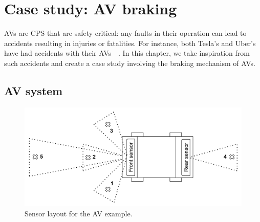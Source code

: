 \section{Case study: \acf{AV} braking}
\label{sec:case}

\acfp{AV} are \acf{CPS} that are safety critical: any faults in their operation can lead to accidents resulting in injuries or fatalities.
For instance, both Tesla's and Uber's have had accidents with their \acp{AV}~\cite{coldewey_2018}~\cite{stewart_2018}.
In this chapter, we take inspiration from such accidents and create a case study involving the braking mechanism of \acp{AV}.

\subsection{\acf{AV} system}
\begin{figure}[h]
	\centering
	\includegraphics[scale=0.4]{Content/fig/AV.pdf}
	\caption{Sensor layout for the \ac{AV} example. \label{fig:av}}
\end{figure}

